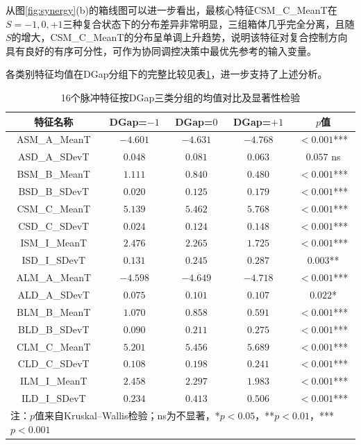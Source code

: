 \documentclass[UTF8,a4paper,12pt]{ctexart}
\begin{document}
从图\ref{fig:synergy}(b)的箱线图可以进一步看出，最核心特征CSM\_C\_MeanT在$S=-1,0,+1$三种复合状态下的分布差异非常明显，三组箱体几乎完全分离，且随$S$的增大，CSM\_C\_MeanT的分布呈单调上升趋势，说明该特征对复合控制方向具有良好的有序可分性，可作为协同调控决策中最优先参考的输入变量。

各类别特征均值在DGap分组下的完整比较见表\ref{tab:class_means}，进一步支持了上述分析。

\begin{table}[H]
\centering
\caption{16个脉冲特征按DGap三类分组的均值对比及显著性检验}
\label{tab:class_means}
\begin{tabular}{ccccc}
\toprule
特征名称 & DGap=$-1$ & DGap=$0$ & DGap=$+1$ & $p$值 \\
\midrule
ASM\_A\_MeanT & $-4.601$ & $-4.631$ & $-4.768$ & $<0.001$*** \\
ASD\_A\_SDevT & $0.048$ & $0.081$ & $0.063$ & $0.057$ ns \\
BSM\_B\_MeanT & $1.111$ & $0.840$ & $0.480$ & $<0.001$*** \\
BSD\_B\_SDevT & $0.020$ & $0.125$ & $0.179$ & $<0.001$*** \\
CSM\_C\_MeanT & $5.139$ & $5.462$ & $5.768$ & $<0.001$*** \\
CSD\_C\_SDevT & $0.024$ & $0.124$ & $0.148$ & $<0.001$*** \\
ISM\_I\_MeanT & $2.476$ & $2.265$ & $1.725$ & $<0.001$*** \\
ISD\_I\_SDevT & $0.131$ & $0.245$ & $0.287$ & $0.003$** \\
ALM\_A\_MeanT & $-4.598$ & $-4.649$ & $-4.718$ & $<0.001$*** \\
ALD\_A\_SDevT & $0.075$ & $0.101$ & $0.107$ & $0.022$* \\
BLM\_B\_MeanT & $1.070$ & $0.858$ & $0.591$ & $<0.001$*** \\
BLD\_B\_SDevT & $0.090$ & $0.211$ & $0.275$ & $<0.001$*** \\
CLM\_C\_MeanT & $5.201$ & $5.456$ & $5.689$ & $<0.001$*** \\
CLD\_C\_SDevT & $0.108$ & $0.198$ & $0.241$ & $<0.001$*** \\
ILM\_I\_MeanT & $2.458$ & $2.297$ & $1.983$ & $<0.001$*** \\
ILD\_I\_SDevT & $0.234$ & $0.413$ & $0.506$ & $<0.001$*** \\
\bottomrule
\multicolumn{5}{l}{\footnotesize 注：$p$值来自Kruskal--Wallis检验；ns为不显著，*$p<0.05$，**$p<0.01$，***$p<0.001$}
\end{tabular}
\end{table}
\end{document}
